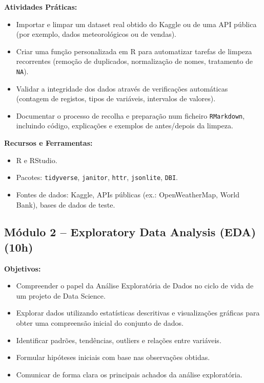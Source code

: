 \documentclass[12pt]{article}
\begin{document}
\textbf{Atividades Práticas:}
\begin{itemize}
  \item Importar e limpar um dataset real obtido do Kaggle ou de uma API pública (por exemplo, dados meteorológicos ou de vendas).
  \item Criar uma função personalizada em R para automatizar tarefas de limpeza recorrentes (remoção de duplicados, normalização de nomes, tratamento de \texttt{NA}).
  \item Validar a integridade dos dados através de verificações automáticas (contagem de registos, tipos de variáveis, intervalos de valores).
  \item Documentar o processo de recolha e preparação num ficheiro \texttt{RMarkdown}, incluindo código, explicações e exemplos de antes/depois da limpeza.
\end{itemize}

\textbf{Recursos e Ferramentas:}
\begin{itemize}
  \item R e RStudio.
  \item Pacotes: \texttt{tidyverse}, \texttt{janitor}, \texttt{httr}, \texttt{jsonlite}, \texttt{DBI}.
  \item Fontes de dados: Kaggle, APIs públicas (ex.: OpenWeatherMap, World Bank), bases de dados de teste.
\end{itemize}





%


\subsection*{Módulo 2 – Exploratory Data Analysis (EDA) (10h)}

\textbf{Objetivos:}
\begin{itemize}
  \item Compreender o papel da Análise Exploratória de Dados no ciclo de vida de um projeto de Data Science.
  \item Explorar dados utilizando estatísticas descritivas e visualizações gráficas para obter uma compreensão inicial do conjunto de dados.
  \item Identificar padrões, tendências, outliers e relações entre variáveis.
  \item Formular hipóteses iniciais com base nas observações obtidas.
  \item Comunicar de forma clara os principais achados da análise exploratória.
\end{itemize}
\end{document}
